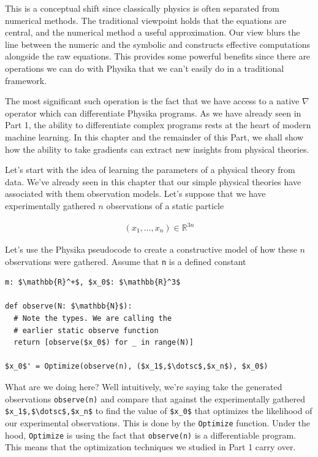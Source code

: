 \documentclass[book.tex]{subfiles}
\begin{document}
This is a conceptual shift since classically physics is often separated from numerical methods. The traditional viewpoint holds that the equations are central, and the numerical method a useful approximation. Our view blurs the line between the numeric and the symbolic and constructs effective computations alongside the raw equations. This provides some powerful benefits since there are operations we can do with Physika that we can't easily do in a traditional framework.

The most significant such operation is the fact that we have access to a native $\nabla$ operator which can differentiate Physika programs. As we have already seen in Part 1, the ability to differentiate complex programs rests at the heart of modern machine learning. In this chapter and the remainder of this Part, we shall show how the ability to take gradients can extract new insights from physical theories.

Let's start with the idea of learning the parameters of a physical theory from data. We've already seen in this chapter that our simple physical theories have associated with them observation models. Let's suppose that we have experimentally gathered $n$ observations of a static particle

\begin{align}
    (x_1, \dotsc, x_n) \in \mathbb{R}^{3n}
\end{align}

Let's use the Physika pseudocode to create a constructive model of how these $n$ observations were gathered. Assume that \lstinline{n} is a defined constant

\begin{lstlisting}
m: $\mathbb{R}^+$, $x_0$: $\mathbb{R}^3$

def observe(N: $\mathbb{N}$):
  # Note the types. We are calling the
  # earlier static observe function
  return [observe($x_0$) for _ in range(N)]
  
$x_0$' = Optimize(observe(n), ($x_1$,$\dotsc$,$x_n$), $x_0$)
\end{lstlisting}

What are we doing here? Well intuitively, we're saying take the generated observations \lstinline{observe(n)} and compare that against the experimentally gathered \lstinline{$x_1$,$\dotsc$,$x_n$} to find the value of \lstinline{$x_0$} that optimizes the likelihood of our experimental observations. This is done by the \lstinline{Optimize} function. Under the hood, \lstinline{Optimize} is using the fact that \lstinline{observe(n)} is a differentiable program. This means that the optimization techniques we studied in Part 1 carry over.
\end{document}
